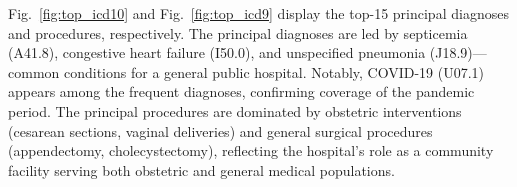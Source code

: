 Fig.~\ref{fig:top_icd10} and Fig.~\ref{fig:top_icd9} display the top-15 principal diagnoses and procedures, respectively. The principal diagnoses are led by septicemia (A41.8), congestive heart failure (I50.0), and unspecified pneumonia (J18.9)---common conditions for a general public hospital. Notably, COVID-19 (U07.1) appears among the frequent diagnoses, confirming coverage of the pandemic period. The principal procedures are dominated by obstetric interventions (cesarean sections, vaginal deliveries) and general surgical procedures (appendectomy, cholecystectomy), reflecting the hospital's role as a community facility serving both obstetric and general medical populations.
